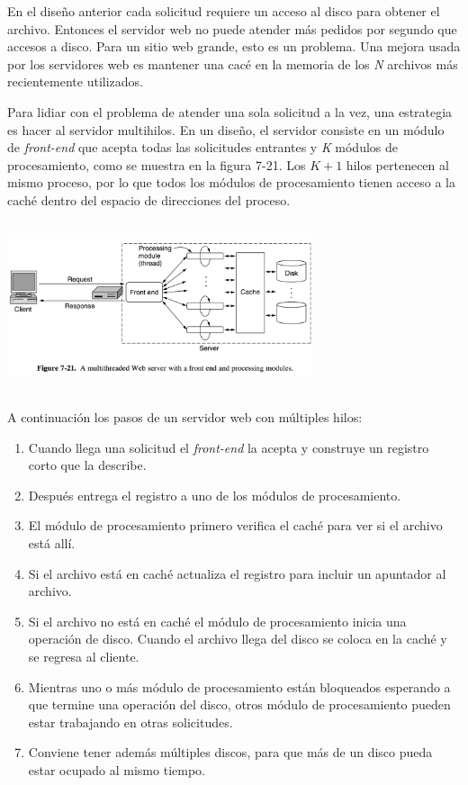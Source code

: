 \documentclass[10pt,a4paper]{report}
\begin{document}
				\par En el diseño anterior cada solicitud requiere un acceso al disco para obtener el archivo. Entonces el servidor web no puede atender más pedidos por segundo que accesos a disco. Para un sitio web grande, esto es un problema. Una mejora usada por los servidores web es mantener una cacé en la memoria de los \textit{N} archivos más recientemente utilizados.

				\par Para lidiar con el problema de atender una sola solicitud a la vez, una estrategia es hacer al servidor multihilos. En un diseño, el servidor consiste en un módulo de \emph{front-end} que acepta todas las solicitudes entrantes y \textit{K} módulos de procesamiento, como se muestra en la figura 7-21. Los \textit{$K+1$} hilos pertenecen al mismo proceso, por lo que todos los módulos de procesamiento tienen acceso a la caché dentro del espacio de direcciones del proceso.
				
				\begin{center}
					\includegraphics[width=9cm, height=5cm]{./imagenes/frontend.png} 
				\end{center}
				
				\par A continuación los pasos de un servidor web con múltiples hilos:
				
				\begin{enumerate}
					\item Cuando llega una solicitud el \textit{front-end} la acepta y construye un registro corto que la describe.
					\item Después entrega el registro a uno de los módulos de procesamiento.
					\item El módulo de procesamiento primero verifica el caché para ver si el archivo está allí.
					\item Si el archivo está en caché actualiza el registro para incluir un apuntador al archivo.
					\item Si el archivo no está en caché el módulo de procesamiento inicia una operación de disco. Cuando el archivo llega del disco se coloca en la caché y se regresa al cliente.
					\item Mientras uno o más módulo de procesamiento están bloqueados esperando a que termine una operación del disco, otros módulo de procesamiento pueden estar trabajando en otras solicitudes.
					\item Conviene tener además múltiples discos, para que más de un disco pueda estar ocupado al mismo tiempo.
				\end{enumerate}
\end{document}
